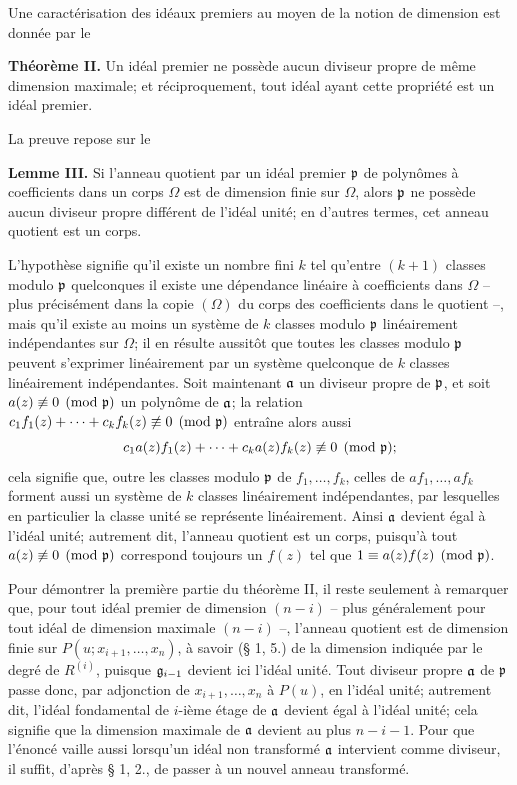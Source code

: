 Une caractérisation des idéaux premiers au moyen de la notion de dimension est donnée par le

\textbf{Théorème II.} Un idéal premier ne possède aucun diviseur propre de même dimension maximale; et réciproquement, tout idéal ayant cette propriété est un idéal premier.

La preuve repose sur le

\textbf{Lemme III.} Si l'anneau quotient par un idéal premier $\mathfrak p$ de polynômes à coefficients dans un corps $\Omega$ est de dimension finie sur $\Omega$, alors $\mathfrak p$ ne possède aucun diviseur propre différent de l'idéal unité; en d'autres termes, cet anneau quotient est un corps.

L'hypothèse signifie qu'il existe un nombre fini $k$ tel qu'entre $(k+1)$ classes modulo $\mathfrak p$ quelconques il existe une dépendance linéaire à coefficients dans $\Omega$ -- plus précisément dans la copie $(\Omega)$ du corps des coefficients dans le quotient --, mais qu'il existe au moins un système de $k$ classes modulo $\mathfrak p$ linéairement indépendantes sur $\Omega$; il en résulte aussitôt que toutes les classes modulo $\mathfrak p$ peuvent s'exprimer linéairement par un système quelconque de $k$ classes linéairement indépendantes. Soit maintenant $\mathfrak a$ un diviseur propre de $\mathfrak p$, et soit $a(z)\not\equiv0\pmod{\mathfrak p}$ un polynôme de $\mathfrak a$; la relation $c_1f_1(z)+\cdots+c_kf_k(z)\not\equiv0\pmod{\mathfrak p}$ entraîne alors aussi
\[
 c_1a(z)f_1(z)+\cdots+c_ka(z)f_k(z)\not\equiv0\pmod{\mathfrak p};
\]
cela signifie que, outre les classes modulo $\mathfrak p$ de $f_1,\ldots,f_k$, celles de $af_1,\ldots,af_k$ forment aussi un système de $k$ classes linéairement indépendantes, par lesquelles en particulier la classe unité se représente linéairement. Ainsi $\mathfrak a$ devient égal à l'idéal unité; autrement dit, l'anneau quotient est un corps, puisqu'à tout $a(z)\not\equiv0\pmod{\mathfrak p}$ correspond toujours un $f(z)$ tel que $1\equiv a(z)f(z)\pmod{\mathfrak p}$.

Pour démontrer la première partie du théorème II, il reste seulement à remarquer que, pour tout idéal premier de dimension $(n-i)$ -- plus généralement pour tout idéal de dimension maximale $(n-i)$ --, l'anneau quotient est de dimension finie sur $P(u;x_{i+1},\ldots,x_n)$, à savoir (\S{} 1, 5.) de la dimension indiquée par le degré de $R^{(i)}$, puisque $\mathfrak g_{i-1}$ devient ici l'idéal unité. Tout diviseur propre $\mathfrak a$ de $\mathfrak p$ passe donc, par adjonction de $x_{i+1},\ldots,x_n$ à $P(u)$, en l'idéal unité; autrement dit, l'idéal fondamental de $i$-ième étage de $\mathfrak a$ devient égal à l'idéal unité; cela signifie que la dimension maximale de $\mathfrak a$ devient au plus $n-i-1$. Pour que l'énoncé vaille aussi lorsqu'un idéal non transformé $\mathfrak a$ intervient comme diviseur, il suffit, d'après \S{} 1, 2., de passer à un nouvel anneau transformé.

